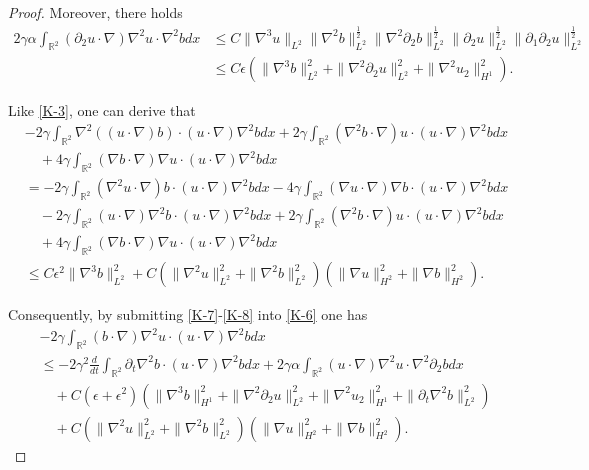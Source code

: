 \documentclass[reqno,11pt]{amsart}
\def\R{\mathbb R}
\numberwithin{Thm}{section}
\begin{document}
\begin{proof}
Moreover, there holds
\begin{align}\label{K-9}
2\gamma\alpha\int_{\R^2}(\partial_2u\cdot\nabla)\nabla^2 u\cdot\nabla^2 bdx
 &\leq
C\|\nabla^3 u\|_{L^2}\|\nabla^2 b\|_{L^2}^{\frac{1}{2}}\|\nabla^2\partial_2 b\|_{L^2}^{\frac{1}{2}}\|\partial_2 u\|_{L^2}^{\frac{1}{2}}\|\partial_1\partial_2 u\|_{L^2}^{\frac{1}{2}}\nonumber\\
&\leq C\epsilon\left(\|\nabla^3 b\|_{L^2}^2+\|\nabla^2\partial_2 u\|_{L^2}^2+\|\nabla^2 u_2\|_{H^1}^2\right).
\end{align}


Like \eqref{K-3}, one can  derive that
\begin{align}\label{K-8}
&-2\gamma\int_{\R^2}\nabla^2((u\cdot\nabla) b)\cdot (u\cdot\nabla)\nabla^2 bdx+2\gamma\int_{\R^2}(\nabla^2 b\cdot \nabla) u\cdot (u\cdot\nabla)\nabla^2 bdx\nonumber\\
&\quad+4\gamma\int_{\R^2}(\nabla b\cdot \nabla)\nabla u\cdot (u\cdot\nabla)\nabla^2 bdx\nonumber\\
&=-2\gamma\int_{\R^2}(\nabla^2 u\cdot\nabla) b\cdot (u\cdot\nabla)\nabla^2 bdx-4\gamma\int_{\R^2}(\nabla u\cdot\nabla) \nabla b\cdot (u\cdot\nabla)\nabla^2 bdx\nonumber\\&\quad-2\gamma\int_{\R^2}( u\cdot\nabla) \nabla^2 b\cdot (u\cdot\nabla)\nabla^2 bdx+2\gamma\int_{\R^2}(\nabla^2 b\cdot \nabla) u\cdot (u\cdot\nabla)\nabla^2 bdx\nonumber\\
&\quad+4\gamma\int_{\R^2}(\nabla b\cdot \nabla)\nabla u\cdot (u\cdot\nabla)\nabla^2 bdx\nonumber\\
&\leq C\epsilon^2\|\nabla^3b\|_{L^2}^2+C(\|\nabla^2u\|_{L^2}^2+\|\nabla^2 b\|_{L^2}^2)(\|\nabla u\|_{H^2}^2+\|\nabla b\|_{H^2}^2).
\end{align}




Consequently, by submitting \eqref{K-7}-\eqref{K-8} into \eqref{K-6} one has
\begin{align}\label{K-1}
&-2\gamma\int_{\R^2}(b\cdot\nabla)\nabla^2 u\cdot(u \cdot \nabla)\nabla^2 bdx\nonumber\\
&\leq -2\gamma^2\frac{d}{dt}\int_{\R^2}\partial_{t}\nabla^2 b\cdot (u\cdot\nabla)\nabla^2 bdx+2\gamma\alpha\int_{\R^2}(u\cdot\nabla)\nabla^2 u\cdot\nabla^2\partial_2 bdx \nonumber\\
&\quad+C(\epsilon+\epsilon^2)(\|\nabla^3b\|_{H^1}^2+\|\nabla^2\partial_2 u\|_{L^2}^2+\|\nabla^2 u_2\|_{H^1}^2+\|\partial_t\nabla^2 b\|_{L^{2}}^2)\nonumber\\
&\quad+C(\|\nabla^2u\|_{L^2}^2+\|\nabla^2 b\|_{L^2}^2)\left(\|\nabla u\|_{H^2}^2+\|\nabla b\|_{H^2}^2\right).
\end{align}


\end{proof}
\end{document}

